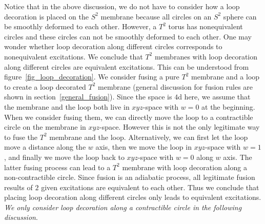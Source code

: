 \documentclass[11pt,nofootinbib,preprint]{revtex4-1}
\begin{document}
Notice that in the above discussion, we do not have to consider how a loop decoration is placed on the $S^2$ membrane because all circles on an $S^2$ sphere can be smoothly deformed to each other. However, a $T^2$ torus has nonequivalent circles and these circles can not be smoothly deformed to each other. One may wonder whether loop decoration along different circles corresponds to nonequivalent excitations. We conclude that $T^2$ membranes with loop decoration along different circles are equivalent excitations. This can be understood from figure~\ref{fig_loop_decoration}. We consider fusing a pure $T^2$ membrane and a loop to create a loop decorated $T^2$ membrane (general discussion for fusion rules are shown in section~\ref{general_fusion}). Since the space is $4$d here, we assume that the membrane and the loop both live in $xyz$-space with $w=0$ at the beginning. When we consider fusing them, we can directly move the loop to a contractible circle on the membrane in $xyz$-space. However this is not the only legitimate way to fuse the $T^2$ membrane and the loop. Alternatively, we can first let the loop move a distance along the $w$ axis, then we move the loop in  $xyz$-space with $w=1$, and finally we move the loop back to $xyz$-space with $w=0$ along $w$ axis. The latter fusing process can lead to a $T^2$ membrane with loop decoration along a non-contractible circle. Since fusion is an adiabatic process, all legitimate fusion results of $2$ given excitations are equivalent to each other. Thus we conclude that placing loop decoration along different circles only leads to equivalent excitations. \textit{We only consider loop decoration along a contractible circle in the following discussion}.
\end{document}
